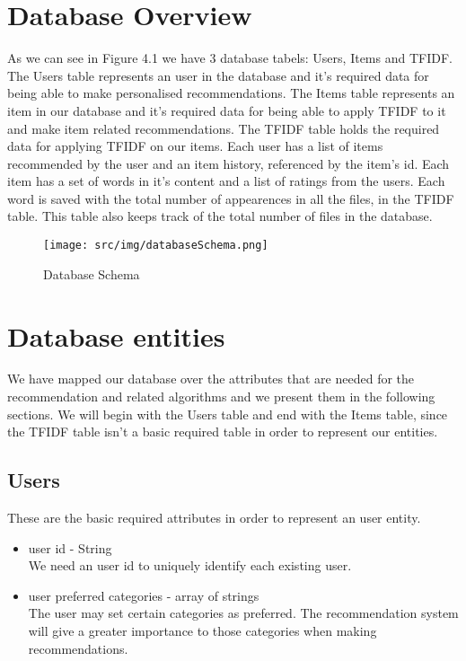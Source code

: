 \section{Database Overview}
\label{sec:users}
As we can see in Figure 4.1 we have 3 database tabels: Users, Items and TFIDF. The Users table represents an user in the database and it's required data for being able to make personalised recommendations. The Items table represents an item in our database and it's required data for being able to apply TFIDF to it and make item related recommendations. The TFIDF table holds the required data for applying TFIDF on our items.
Each user has a list of items recommended by the user and an item history, referenced by the item's id. Each item has a set of words in it's content and a list of ratings from the users. Each word is saved with the total number of appearences in all the files, in the TFIDF table. This table also keeps track of the total number of files in the database.
\begin{figure}[h]
\caption{Database Schema}
\texttt{[image: src/img/databaseSchema.png]}
\end{figure}

\section{Database entities}
\label{sec:database-entities}

We have mapped our database over the attributes that are needed for the recommendation and related algorithms and we present them in the following sections. We will begin with the Users table and end with the Items table, since the TFIDF table isn't a basic required table in order to represent our entities.

\subsection{Users}
\label{sec:users}
These are the basic required attributes in order to represent an user entity.
\begin{itemize}
	\item user id - String
		\\ We need an user id to uniquely identify each existing user.
	\item user preferred categories - array of strings
		\\ The user may set certain categories as preferred. 
		The recommendation system will give a greater importance to those categories when making recommendations.
\end{itemize}


